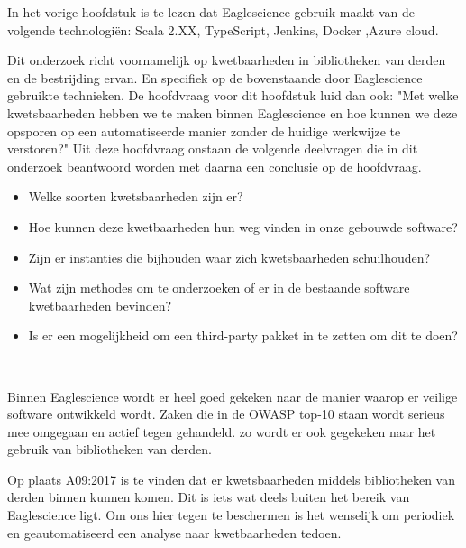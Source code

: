



In het vorige hoofdstuk is te lezen dat Eaglescience gebruik maakt van de volgende technologi\"en: Scala 2.XX, TypeScript, Jenkins, Docker ,Azure cloud.

Dit onderzoek richt voornamelijk op kwetbaarheden in bibliotheken  van derden en de bestrijding ervan.
En specifiek op de bovenstaande door Eaglescience gebruikte technieken.
De hoofdvraag voor dit hoofdstuk luid dan ook: "Met welke kwetsbaarheden hebben we te maken binnen Eaglescience en hoe kunnen we deze opsporen op een automatiseerde manier zonder de huidige werkwijze te verstoren?" Uit deze hoofdvraag onstaan de volgende deelvragen die in dit onderzoek beantwoord worden met daarna een conclusie op de hoofdvraag.

\begin{itemize}
    \item Welke soorten kwetsbaarheden zijn er?
    \item Hoe kunnen deze kwetbaarheden hun weg vinden in onze gebouwde software?
    \item Zijn er instanties die bijhouden waar zich kwetsbaarheden schuilhouden?
    \item Wat zijn methodes om te onderzoeken of er in de bestaande software kwetbaarheden bevinden?
    \item Is er een mogelijkheid om een third-party pakket in te zetten om dit te doen?
\end{itemize}

\

Binnen Eaglescience wordt er heel goed gekeken naar de manier waarop er veilige software ontwikkeld wordt.
Zaken die in de OWASP top-10 staan wordt serieus mee omgegaan en actief tegen gehandeld. zo wordt er ook gegekeken naar het gebruik van bibliotheken van derden.

Op plaats A09:2017 is te vinden dat er kwetsbaarheden middels bibliotheken van derden binnen kunnen komen. Dit is iets wat deels buiten het bereik van Eaglescience ligt. Om ons hier tegen te beschermen is het wenselijk om periodiek en geautomatiseerd een analyse naar kwetbaarheden tedoen.

